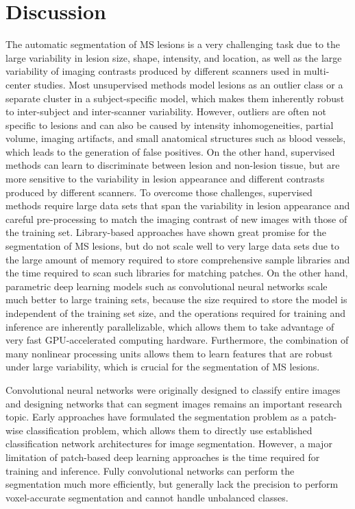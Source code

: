 \section{Discussion}

The automatic segmentation of MS lesions is a very challenging task due to the
large variability in lesion size, shape, intensity, and location, as well as the
large variability of imaging contrasts produced by different scanners used in
multi-center studies. Most unsupervised methods model lesions as an outlier
class or a separate cluster in a subject-specific model, which makes them
inherently robust to inter-subject and inter-scanner variability. However,
outliers are often not specific to lesions and can also be caused by intensity
inhomogeneities, partial volume, imaging artifacts, and small anatomical
structures such as blood vessels, which leads to the generation of false
positives. On the other hand, supervised methods can learn to discriminate
between lesion and non-lesion tissue, but are more sensitive to the variability
in lesion appearance and different contrasts produced by different scanners. To
overcome those challenges, supervised methods require large data sets that span
the variability in lesion appearance and careful pre-processing to match the
imaging contrast of new images with those of the training set. Library-based
approaches have shown great promise for the segmentation of MS lesions, but do
not scale well to very large data sets due to the large amount of memory
required to store comprehensive sample libraries and the time required to scan
such libraries for matching patches. On the other hand, parametric deep learning
models such as convolutional neural networks scale much better to large training
sets, because the size required to store the model is independent of the
training set size, and the operations required for training and inference are
inherently parallelizable, which allows them to take advantage of very fast
GPU-accelerated computing hardware. Furthermore, the combination of many
nonlinear processing units allows them to learn features that are robust under
large variability, which is crucial for the segmentation of MS lesions.

Convolutional neural networks were originally designed to classify entire images
and designing networks that can segment images remains an important research
topic. Early approaches have formulated the segmentation problem as a patch-wise
classification problem, which allows them to directly use established
classification network architectures for image segmentation.
However, a major limitation of patch-based deep learning approaches is the time
required for training and inference. Fully convolutional networks can perform
the segmentation much more efficiently, but generally lack the precision to
perform voxel-accurate segmentation and cannot handle unbalanced classes.

